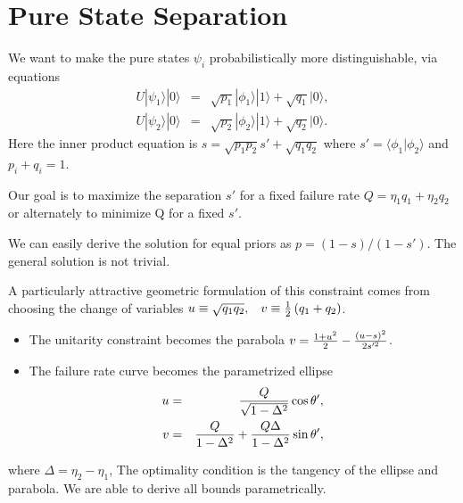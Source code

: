\documentclass{beamer}
\newcommand{\ke}[1]{|#1\rangle}
\newcommand{\bk}[2]{\langle #1|#2\rangle}
\begin{document}
\section{Pure State Separation}
\begin{frame}
We want to make the pure states $\psi_i$ probabilistically more distinguishable, via
equations
\begin{eqnarray*}
U|\psi_{1}\rangle|0\rangle & = & \sqrt{p_{1}}|\phi_{1}\rangle|1\rangle+\sqrt{q_{1}}\ke 0,\nonumber \\
U|\psi_{2}\rangle|0\rangle & = & \sqrt{p_{2}}|\phi_{2}\rangle|1\rangle+\sqrt{q_{2}}\ke 0.
\end{eqnarray*}
Here the inner product equation is $s = \sqrt{p_1 p_2} s' + \sqrt{q_1 q_2}$ where $s' = \bk{\phi_1}{\phi_2}$ and $p_i + q_i =1$.

Our goal is to maximize the separation $s'$ for a fixed failure rate $Q = \eta_1 q_1 + \eta_2 q_2$ or alternately to minimize Q for a fixed $s'$.

We can easily derive the solution for equal priors as $p = (1-s)/(1-s')$. The general solution is not trivial.
\end{frame}
\begin{frame}
A particularly attractive geometric formulation of this constraint comes from
choosing the change of variables 
$u\equiv\sqrt{q_{1}q_{2}},\hspace{0.3cm}v\equiv\frac{1}{2}\left(q_{1}+q_{2}\right)$.
\begin{itemize}
\item
The unitarity constraint becomes the parabola $v={1+u^2\over2}-{(u-s)^2\over2s'^2}$.
\item
The failure rate curve becomes the parametrized ellipse
%
\begin{eqnarray}
u&=&{Q\over\sqrt{1-\Delta^2}}\cos\theta',\nonumber\\
v&=&{Q\over1-\Delta^2}+{Q\Delta\over1-\Delta^2}\sin\theta',
\end{eqnarray}
\end{itemize}
where $\Delta = \eta_2 - \eta_1$,
The optimality condition is the tangency of the ellipse and parabola. We are able to derive all bounds parametrically.
\end{frame}
\end{document}
